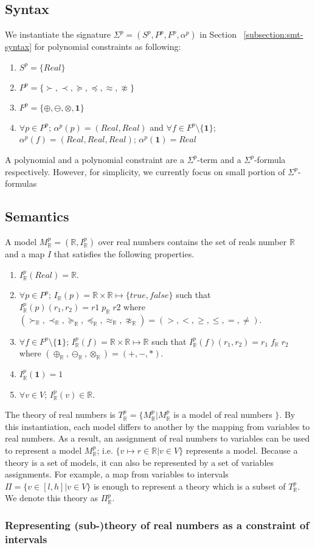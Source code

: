 \subsection{Syntax}
We instantiate the signature $\Sigma^p = (S^p, P^p, F^p, \alpha^p)$ in Section ~\ref{subsection:smt-syntax} for polynomial constraints as following:
\begin{enumerate}
\item $S^p = \{Real\}$
\item $P^p = \{\succ, \prec, \succeq, \preceq, \approx, \not\approx\}$
\item $F^p = \{\oplus, \ominus, \otimes, \mathbf{1}\}$
\item $\forall p \in P^p$; $\alpha^p(p) = (Real, Real)$ and $\forall f \in F^p\setminus \{\mathbf{1}\}$; $\alpha^p(f) = (Real, Real, Real)$; $\alpha^p(\mathbf{1})=Real$
\end{enumerate}
A polynomial and a polynomial constraint are a $\Sigma^p$-term and a $\Sigma^p$-formula respectively. However, for simplicity, we currently focus on small portion of $\Sigma^p$-formulas

\subsection{Semantics}
A model $M^p_{\mathbb{R}} = (\mathbb{R}, I^p_{\mathbb{R}})$ over real numbers contains the set of reals number $\mathbb{R}$ and a map $I$ that satisfies the following properties.
\begin{enumerate}
\item $I^p_{\mathbb{R}}(Real) = \mathbb{R}$.
\item $\forall p \in P^p$; $I_{\mathbb{R}}(p) = \mathbb{R} \times \mathbb{R} \mapsto \{true, false\}$ such that $ I_\mathbb{R}^p(p)(r_1, r_2) = r1 \; p_{\mathbb{R}} \; r2$ where $(\succ_\mathbb{R}, \prec_{\mathbb{R}},\succeq_\mathbb{R},\preceq_{\mathbb{R}}, \approx_\mathbb{R}, \not\approx_\mathbb{R}) = (>, <, \ge, \le, =, \neq)$.
\item $\forall f \in F^p \setminus \{\mathbf{1}\}$; $I^p_{\mathbb{R}}(f) = \mathbb{R} \times \mathbb{R} \mapsto \mathbb{R}$ such that $I^p_{\mathbb{R}}(f)(r_1, r_2)  = r_1 \; f_{\mathbb{R}} \; r_2$ where $(\oplus_{\mathbb{R}}, \ominus_{\mathbb{R}}, \otimes_{\mathbb{R}}) = (+, -, *)$.
\item $I^p_\mathbb{R}(\mathbf{1}) = 1$
\item $\forall v \in V$; $I^p_{\mathbb{R}}(v) \in \mathbb{R}$.
\end{enumerate}
The theory of real numbers is $T^p_{\mathbb{R}} = \{M^p_{\mathbb{R}} | M^p_{\mathbb{R}}$ is a model of real numbers $\}$.
By this instantiation, each model differs to another by the mapping from variables to real numbers. As a result, an assignment of real numbers to variables can be used to represent a model $M^p_{\mathbb{R}}$; i.e. $\{v \mapsto r \in \mathbb{R} | v \in V\}$ represents a model. Because a theory is a set of models, it can also be represented by a set of variables assignments. For example, a map from variables to intervals $\Pi = \{v \in [l, h] | v \in V\}$ is enough to represent a theory which is a subset of $T^p_\mathbb{R}$. We denote this theory as $\Pi^p_\mathbb{R}$.

\subsubsection*{Representing (sub-)theory of real numbers as a constraint of intervals}


